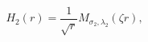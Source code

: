 \begin{equation}
H_{2}(r)=\frac{1}{\sqrt{r}}M_{\sigma_{2}, \lambda_{2}}\left( \zeta r\right),
\label{16}
\end{equation}

